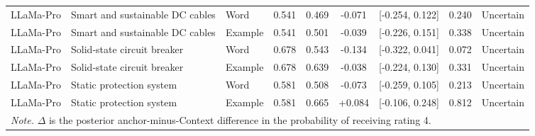 \begin{landscape}
\begin{longtable}{lllcccccc}
LLaMa-Pro & Smart and sustainable DC cables & Word & 0.541 & 0.469 & -0.071 & [-0.254, 0.122] & 0.240 & Uncertain \\
LLaMa-Pro & Smart and sustainable DC cables & Example & 0.541 & 0.501 & -0.039 & [-0.226, 0.151] & 0.338 & Uncertain \\
LLaMa-Pro & Solid-state circuit breaker & Word & 0.678 & 0.543 & -0.134 & [-0.322, 0.041] & 0.072 & Uncertain \\
LLaMa-Pro & Solid-state circuit breaker & Example & 0.678 & 0.639 & -0.038 & [-0.224, 0.130] & 0.331 & Uncertain \\
LLaMa-Pro & Static protection system & Word & 0.581 & 0.508 & -0.073 & [-0.259, 0.105] & 0.213 & Uncertain \\
LLaMa-Pro & Static protection system & Example & 0.581 & 0.665 & +0.084 & [-0.106, 0.248] & 0.812 & Uncertain \\
\midrule
\multicolumn{9}{p{0.96\linewidth}}{\footnotesize\textit{Note.} $\Delta$ is the posterior anchor-minus-Context difference in the probability of receiving rating 4.}\\
\end{longtable}
\end{landscape}
